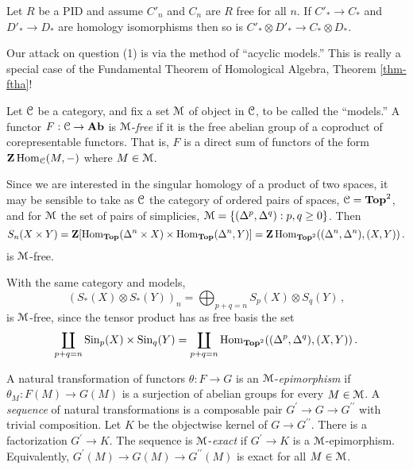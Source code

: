 \begin{corollary}\label{acyclic-tensor}
Let $R$ be a PID and assume $C'_n$ and $C_n$ are $R$ free for all $n$.
If $C'_\ast\to C_\ast$ and $D'_\ast\to D_\ast$ 
are homology
isomorphisms then so is $C'_\ast\otimes D'_\ast\to C_\ast\otimes D_\ast$. 
\end{corollary}

Our attack on question (1) is via the method of ``acyclic models.'' This is
really a special case of the Fundamental Theorem of Homological Algebra,
Theorem \ref{thm-ftha}!

\begin{definition}
Let $\mathcal C$ be a category, and fix a set $\mathcal M$ of object in $\mathcal C$, 
to be called the ``models.'' 
A functor $F:\mathcal C\to\mathbf{Ab}$ is $\mathcal M$-{\em free} if it is the free abelian 
group of a coproduct of corepresentable functors. That is, $F$ is a 
direct sum of functors of the form $\mathbf Z\operatorname{Hom}_\mathcal C(M,-)$ where $M\in\mathcal M$.
\end{definition}
\begin{example}
Since we are interested in the singular homology of a product of two spaces, 
it may be sensible to take as $\mathcal C$ the category of ordered pairs of spaces,
$\mathcal C=\mathbf{Top}^2$, and for $\mathcal M$ the set of pairs of
simplicies, $\mathcal M=\{(\Delta^p,\Delta^q):p,q\geq0\}$. Then 
\[
S_n(X\times Y)=\mathbf Z[\operatorname{Hom}_\mathbf{Top}(\Delta^n\times X)\times
\operatorname{Hom}_{\mathbf{Top}}(\Delta^n,Y)]=
\mathbf Z\operatorname{Hom}_{\mathbf{Top}^2}((\Delta^n,\Delta^n),(X,Y))\,.
\]
is $\mathcal M$-free.
\end{example}
\begin{example}
With the same category and models, 
\[
(S_*(X)\otimes S_*(Y))_n=\bigoplus_{p+q=n}S_p(X)\otimes S_q(Y)\,,
\]
is $\mathcal M$-free, since the tensor product has as free basis the set
\[
\coprod_{p+q=n}\mathrm{Sin}_p(X)\times\mathrm{Sin}_q(Y)
=\coprod_{p+q=n}\operatorname{Hom}_{\mathbf{Top}^2}((\Delta^p,\Delta^q),(X,Y))\,.
\]
\end{example}
\begin{definition}
A natural transformation of functors $\theta:F\to G$ is an $\mathcal M$-{\em epimorphism} if $\theta_M:F(M)\to G(M)$ is a surjection of abelian groups for every $M\in\mathcal M$. A {\em sequence} of natural transformations is a composable pair 
$G^\prime\to G\to G^{\prime\prime}$ with trivial composition. 
Let $K$ be the objectwise kernel of $G\to G^{\prime\prime}$. There is a factorization $G^\prime\to K$. The sequence is $\mathcal M$-{\em exact} if $G^\prime\to K$ is a $\mathcal M$-epimorphism. Equivalently, $G^\prime(M)\to G(M)\to G^{\prime\prime}(M)$ is exact for all $M\in\mathcal M$.
\end{definition}
